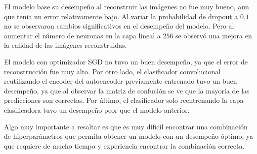 \documentclass[aps,prl,reprint,groupedaddress]{revtex4-2}
\begin{document}
El modelo base su desempeño al reconstruir las imágenes no fue muy bueno, aun 
que tenia un error relativamente bajo. Al variar la probabilidad de dropout a
$0.1$ no se observaron cambios significativos en el desempeño del modelo. Pero 
al aumentar el número de neuronas en la capa lineal a $256$ se observó una
mejora en la calidad de las imágenes reconstruidas.

El modelo con optimizador SGD no tuvo un buen desempeño, ya que el error de
reconstrucción fue muy alto. Por otro lado, el clasificador convolucional
reutilizando el encoder del autoencoder previamente entrenado tuvo un buen
desempeño, ya que al observar la matriz de confución se ve que la mayoría de las
predicciones son correctas. Por último, el clasificador solo reentrenando la
capa clasificadora tuvo un desempeño peor que el modelo anterior.

Algo muy importante a resaltar es que es muy dificil encontrar una combinación
de hiperparámetros que permita obtener un modelo con un desempeño óptimo, ya que
requiere de mucho tiempo y experiencia encontrar la combinación correcta.





\end{document}
